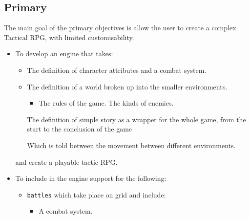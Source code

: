 \subsection{Primary}
\label{primary}
The main goal of the primary objectives is allow the user to create a complex Tactical RPG, with limited customisability.  
\begin{itemize}
\item To develop an engine that takes:
\begin{itemize}

 \item The definition of character attributes and a combat system.
	\item The definition of a world broken up into the smaller environments.
	\begin{itemize}
		\item The rules of the game.
		\tick The kinds of enemies.
	\end{itemize}
	
	\tick The definition of simple story as a wrapper for the whole game, from the start to the conclusion of the game
	\begin{itemize}
		\tick Which is told between the movement between different environments.
	\end{itemize}
	                        
\end{itemize}
and create a playable tactic RPG.

\item To include in the engine support for the following:

\begin{itemize}
	\tick \texttt{units} with a fixed set of associated attributes such as:
	\begin{itemize}
		\tick Hit-points (which represent the health of the unit).
		\tick Strength.
		\tick Defence.
		\tick Move (The number of tiles the unit can move each turn).
	\end{itemize}
	
	\item \texttt{battles} which take place on grid and include:
	\begin{itemize}
		\tick  A set number of \texttt{units} for each player.
		\tick  A Winning \texttt{condition}, which is defeat all of the other player's units.
		\tick  Battles are \texttt{turn based} meaning only one unit performs at one time.   
		\item  A combat system. \marginpar{\textbf{Nearly}}
	\end{itemize}
	

\end{itemize}
\end{itemize}
